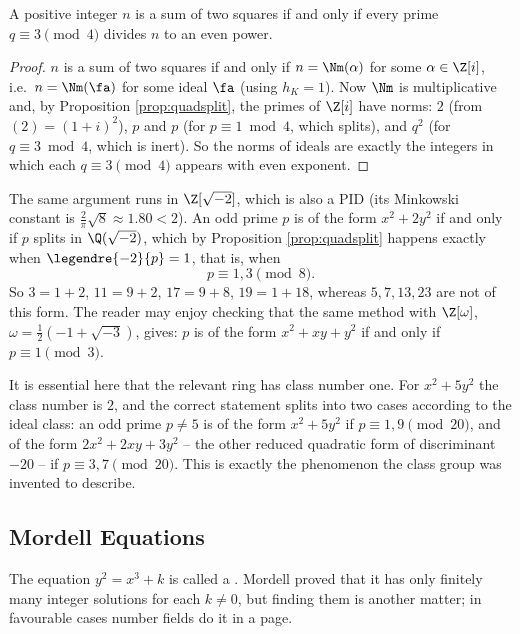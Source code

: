 \begin{corollary}
	A positive integer $n$ is a sum of two squares if and only if every prime $q \equiv 3 \pmod 4$ divides $n$ to an even power.
\end{corollary}

\begin{proof}
	$n$ is a sum of two squares if and only if $n = \Nm(\alpha)$ for some $\alpha \in \Z[i]$, i.e.\ $n = \Nm(\fa)$ for some ideal $\fa$ (using $h_K = 1$). Now $\Nm$ is multiplicative and, by Proposition \ref{prop:quadsplit}, the primes of $\Z[i]$ have norms: $2$ (from $(2) = (1+i)^2$), $p$ and $p$ (for $p \equiv 1 \bmod 4$, which splits), and $q^2$ (for $q\equiv3\bmod4$, which is inert). So the norms of ideals are exactly the integers in which each $q \equiv 3\pmod 4$ appears with even exponent.
\end{proof}

\begin{example}
	The same argument runs in $\Z[\sqrt{-2}]$, which is also a PID (its Minkowski constant is $\tfrac2\pi\sqrt8 \approx 1.80 < 2$). An odd prime $p$ is of the form $x^2+2y^2$ if and only if $p$ splits in $\Q(\sqrt{-2})$, which by Proposition \ref{prop:quadsplit} happens exactly when $\legendre{-2}{p} = 1$, that is, when
	$$p \equiv 1, 3 \pmod 8.$$
	So $3 = 1+2$, $11 = 9+2$, $17 = 9+8$, $19 = 1+18$, whereas $5, 7, 13, 23$ are not of this form. The reader may enjoy checking that the same method with $\Z[\omega]$, $\omega = \tfrac12(-1+\sqrt{-3})$, gives: $p$ is of the form $x^2+xy+y^2$ if and only if $p \equiv 1 \pmod 3$.
\end{example}

\begin{remark}
	It is essential here that the relevant ring has class number one. For $x^2+5y^2$ the class number is $2$, and the correct statement splits into two cases according to the ideal class: an odd prime $p \neq 5$ is of the form $x^2+5y^2$ if $p \equiv 1,9 \pmod{20}$, and of the form $2x^2+2xy+3y^2$ -- the other reduced quadratic form of discriminant $-20$ -- if $p \equiv 3,7\pmod{20}$. This is exactly the phenomenon the class group was invented to describe.
\end{remark}

\subsection{Mordell Equations}

The equation $y^2 = x^3+k$ is called a . Mordell proved that it has only finitely many integer solutions for each $k \neq 0$, but finding them is another matter; in favourable cases number fields do it in a page.

